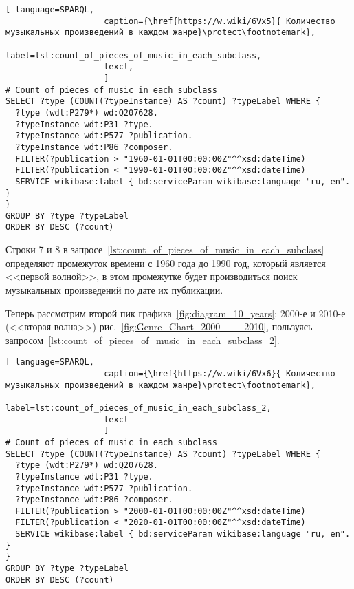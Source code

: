 \begin{lstlisting}[ language=SPARQL,
                    caption={\href{https://w.wiki/6Vx5}{ Количество музыкальных произведений в каждом жанре}\protect\footnotemark},
                    label=lst:count_of_pieces_of_music_in_each_subclass,
                    texcl,
                    ]
# Count of pieces of music in each subclass
SELECT ?type (COUNT(?typeInstance) AS ?count) ?typeLabel WHERE {
  ?type (wdt:P279*) wd:Q207628.
  ?typeInstance wdt:P31 ?type.
  ?typeInstance wdt:P577 ?publication.
  ?typeInstance wdt:P86 ?composer.
  FILTER(?publication > "1960-01-01T00:00:00Z"^^xsd:dateTime)        
  FILTER(?publication < "1990-01-01T00:00:00Z"^^xsd:dateTime)
  SERVICE wikibase:label { bd:serviceParam wikibase:language "ru, en". }
}
GROUP BY ?type ?typeLabel
ORDER BY DESC (?count)
\end{lstlisting}%

Строки 7 и 8 в запросе~\ref{lst:count_of_pieces_of_music_in_each_subclass} определяют промежуток времени с 1960 года до 1990 год, который является <<первой волной>>, в этом промежутке будет производиться поиск музыкальных произведений по дате их публикации.






Теперь рассмотрим второй пик графика~\ref{fig:diagram_10_years}: 2000-е и 2010-е (<<вторая волна>>) рис.~\ref{fig:Genre_Chart_2000_—_2010}, пользуясь запросом~\ref{lst:count_of_pieces_of_music_in_each_subclass_2}.

\begin{lstlisting}[ language=SPARQL,
                    caption={\href{https://w.wiki/6Vx6}{ Количество музыкальных произведений в каждом жанре}\protect\footnotemark},
                    label=lst:count_of_pieces_of_music_in_each_subclass_2,
                    texcl 
                    ]
# Count of pieces of music in each subclass
SELECT ?type (COUNT(?typeInstance) AS ?count) ?typeLabel WHERE {
  ?type (wdt:P279*) wd:Q207628.
  ?typeInstance wdt:P31 ?type.
  ?typeInstance wdt:P577 ?publication.
  ?typeInstance wdt:P86 ?composer.
  FILTER(?publication > "2000-01-01T00:00:00Z"^^xsd:dateTime)        
  FILTER(?publication < "2020-01-01T00:00:00Z"^^xsd:dateTime)
  SERVICE wikibase:label { bd:serviceParam wikibase:language "ru, en". }
}
GROUP BY ?type ?typeLabel
ORDER BY DESC (?count)
\end{lstlisting}%

